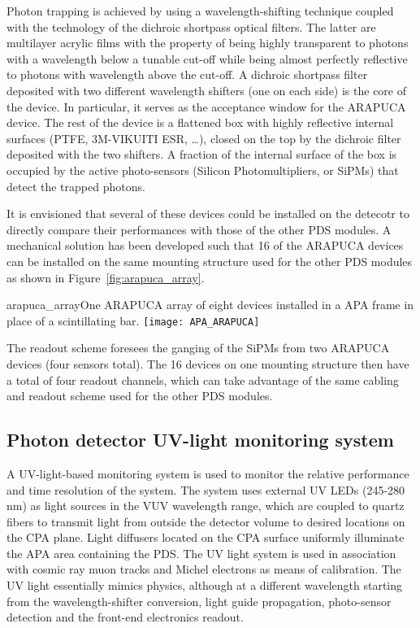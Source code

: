 Photon trapping is achieved by using a wavelength-shifting technique coupled with the technology of the dichroic shortpass optical filters. The latter are multilayer acrylic films 
with the  property of being highly transparent to photons with a wavelength below a tunable cut-off while being almost perfectly reflective to photons with wavelength above the cut-off. 
A dichroic shortpass filter deposited with two different wavelength shifters (one on each side) is the core of the device. In particular, it serves as the acceptance window for the 
ARAPUCA device. The rest of the device is a flattened box with highly reflective internal surfaces (PTFE, 3M-VIKUITI ESR, \dots), closed on the top by the 
dichroic  filter deposited with the two shifters. A fraction of the internal surface of the box is occupied by the active photo-sensors (Silicon Photomultipliers, or SiPMs) that detect the trapped photons.

It is envisioned that several of these devices could be installed on the detecotr to directly compare their performances with those of the
other PDS modules. A mechanical solution has been developed such that 16 of the ARAPUCA devices can be installed on the same mounting structure used for the other PDS modules as shown in Figure~\ref{fig:arapuca_array}.
\begin{cdrfigure}
  {arapuca_array}{One ARAPUCA array of eight devices installed in a APA frame in place of a scintillating bar.}
\texttt{[image: APA\_ARAPUCA]}
\end{cdrfigure}

The readout scheme foresees the ganging of the SiPMs from two ARAPUCA devices (four sensors total). The 16 devices on one mounting structure then have a total of four readout channels, which can take advantage of the same cabling and readout scheme used for the other PDS modules.

\subsection{Photon detector UV-light monitoring system}
\label{sec_pd_calib}

A UV-light-based monitoring system is used to monitor the relative performance and time resolution of the system.
The system uses external UV LEDs (245-280\,nm) as light sources in the VUV wavelength range, which are coupled to quartz fibers to transmit light from outside the detector volume to desired locations on the CPA plane.
Light diffusers located on the CPA surface uniformly illuminate the APA area 
containing the  PDS.
The UV light system is used in association with cosmic ray muon 
tracks and Michel electrons as means of calibration.
The UV light essentially mimics physics, although at a different wavelength starting from the wavelength-shifter conversion, 
light guide propagation, photo-sensor detection and the front-end electronics readout.
	
